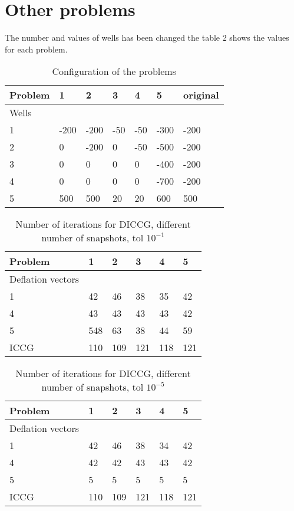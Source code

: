\documentclass[a4paper,10pt]{article}
\title{}
\author{}
\begin{document}
\section{Other problems}
The number and values of wells has been changed the table 2 shows the values for each problem.
\begin{table}[!]
\begin{tabular}{ |p{1.5cm}|p{1.2cm}|p{1.2cm}|p{1.2cm}|p{1.2cm}| p{1.2cm}| p{1.2cm}|} 
 \hline
  Problem  & 1& 2 & 3& 4&5&original\\
  \hline
  Wells&&&&&&\\
  \hline

  1 & -200 &-200&  -50 &  -50&-300 &-200\\ 
   2 & 0 & -200&  0 &  -50 &-500& -200\\ 
  3 & 0 & 0&  0&  0 &-400 &-200\\ 
4 & 0 & 0& 0 &  0&-700&-200\\ 
5& 500& 500& 20 &  20&600 &500\\ 
\hline
\end{tabular}
\caption{Configuration of the problems}
\end{table}
\begin{table}[!]
\begin{tabular}{ |p{1.5cm}|p{1.5cm}|p{1.5cm}|p{1.5cm}|p{1.5cm}| p{1.5cm}| } 
 \hline
  Problem  & 1& 2 & 3& 4&5\\
  \hline
  Deflation vectors&&&&&\\
  \hline
  1 & 42 & 46&  38 &  35 &42 \\ 
   4 & 43 & 43&  43 &  43 &42 \\ 
  5 & 548 & 63&  38 &  44 &59 \\ 
ICCG & 110 & 109& 121 &  118&121 \\ 
\hline
\end{tabular}
\caption{Number of iterations for DICCG, different number of snapshots, tol $10^{-1}$}
\end{table}
\begin{table}[!]
\begin{tabular}{ |p{1.5cm}|p{1.5cm}|p{1.5cm}|p{1.5cm}|p{1.5cm}| p{1.5cm}| } 
 \hline
  Problem  & 1& 2 & 3& 4&5\\
  \hline
  Deflation vectors&&&&&\\
  \hline
  1 & 42 & 46&  38 &  34 &42 \\ 
   4 & 42 & 42&  43 &  43 &42 \\ 
  5 & 5 & 5&  5 &  5 &5 \\ 
ICCG & 110 & 109& 121 &  118&121 \\ 
\hline
\end{tabular}
\caption{Number of iterations for DICCG, different number of snapshots, tol $10^{-5}$}
\end{table}
\end{document}
